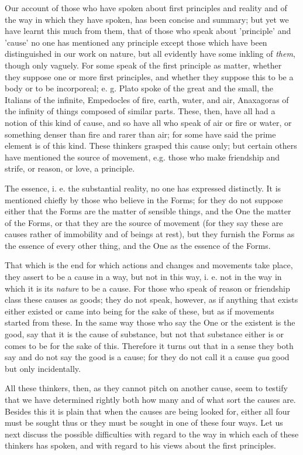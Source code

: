 
Our account of those who have spoken about first principles and reality and of the way in which they have spoken, has been concise and summary; but yet we have learnt this much from them, that of those who speak about 'principle' and 'cause' no one has mentioned any principle except those which have been distinguished in our work on nature, but all evidently have some inkling of \emph{them}, though only vaguely. For some speak of the first principle as matter, whether they suppose one or more first principles, and whether they suppose this to be a body or to be incorporeal; e. g. Plato spoke of the great and the small, the Italians of the infinite, Empedocles of fire, earth, water, and air, Anaxagoras of the infinity of things composed of similar parts. These, then, have all had a notion of this kind of cause, and so have all who speak of air or fire or water, or something denser than fire and rarer than air; for some have said the prime element is of this kind. These thinkers grasped this cause only; but certain others have mentioned the source of movement, e.g. those who make friendship and strife, or reason, or love, a principle.

The essence, i. e. the substantial reality, no one has expressed distinctly. It is mentioned chiefly by those who believe in the Forms; for they do not suppose either that the Forms are the matter of sensible things, and the One the matter of the Forms, or that they are the source of movement (for they say these are causes rather of immobility and of beings at rest), but they furnish the Forms as the essence of every other thing, and the One as the essence of the Forms.

That which is the end for which actions and changes and movements take place, they assert to be a cause in a way, but not in this way, i. e. not in the way in which it is its \emph{nature} to be a cause. For those who speak of reason or friendship class these causes as goods; they do not speak, however, as if anything that exists either existed or came into being for the sake of these, but as if movements started from these. In the same way those who say the One or the existent is the good, say that it is the cause of substance, but not that substance either is or comes to be for the sake of this. Therefore it turns out that in a sense they both say and do not say the good is a cause; for they do not call it a cause \emph{qua} good but only incidentally.

All these thinkers, then, as they cannot pitch on another cause, seem to testify that we have determined rightly both how many and of what sort the causes are. Besides this it is plain that when the causes are being looked for, either all four must be sought thus or they must be sought in one of these four ways. Let us next discuss the possible difficulties with regard to the way in which each of these thinkers has spoken, and with regard to his views about the first principles.

